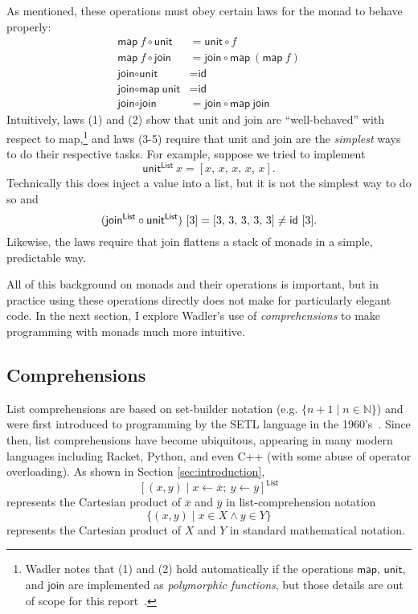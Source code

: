 \documentclass[acmsmall, nonacm, screen]{acmart}
\newcommand{\unit}[2]{\textsf{unit}^{\textsf{#1}}~#2}
\begin{document}
As mentioned, these operations must obey certain laws for the monad to behave properly:
\begin{align}
  \textsf{map}~f \circ \textsf{unit} &= \textsf{unit} \circ f \\
  \textsf{map}~f \circ \textsf{join} &= \textsf{join} \circ \textsf{map}~(\textsf{map}~f) \\
  \textsf{join} \circ \textsf{unit} &= \textsf{id} \\
  \textsf{join} \circ \textsf{map}~\textsf{unit} &= \textsf{id} \\
  \textsf{join} \circ \textsf{join} &= \textsf{join} \circ \textsf{map}~\textsf{join}
\end{align}
Intuitively, laws (1) and (2) show that \textsf{unit} and \textsf{join} are ``well-behaved'' with
respect to \textsf{map},\footnote{Wadler notes that (1) and (2) hold automatically if the
operations $\textsf{map}$, $\textsf{unit}$, and $\textsf{join}$ are implemented as {\em
polymorphic functions}, but those details are out of scope for this
report~\cite{wadler1989theorems}.} and laws (3-5) require that \textsf{unit} and \textsf{join}
are the {\em simplest} ways to do their respective tasks. For example, suppose we tried to implement
\[ \unit{List}{x} = [x,\, x,\, x,\, x,\, x]. \]
Technically this does inject a value into a list, but it is not the simplest way to do so and
\[
  (\textsf{join}^{\textsf{List}} \circ \textsf{unit}^{\textsf{List}})~[3] = [3,\, 3,\, 3,\, 3,\, 3] \neq \textsf{id}~[3]. \\
\]
Likewise, the laws require that \textsf{join} flattens a stack of monads in a simple, predictable
way.

All of this background on monads and their operations is important, but in practice using these
operations directly does not make for particularly elegant code. In the next section, I explore
Wadler's use of {\em comprehensions} to make programming with monads much more intuitive.

\subsection{Comprehensions}

List comprehensions are based on set-builder notation (e.g. $\{n + 1 \mid n \in \mathbb{N}\}$)
and were first introduced to programming by the SETL language in the
1960's~\cite{schwartz2012programming}. Since then, list comprehensions have become ubiquitous,
appearing in many modern languages including Racket, Python, and even C++ (with some abuse of
operator overloading). As shown in Section \ref{sec:introduction},
\[ [(x, y) \mid x \leftarrow \overline{x};\ y \leftarrow \overline{y}]^{\textsf{List}} \]
represents the Cartesian product of $\overline{x}$ and $\overline{y}$ in list-comprehension notation
\[ \{(x, y) \mid x \in X \wedge y \in Y\} \]
represents the Cartesian product of $X$ and $Y$ in standard mathematical notation.
\end{document}
